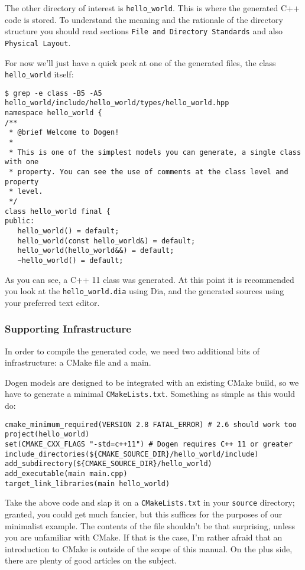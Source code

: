 \documentclass[11pt]{article}
\begin{document}
The other directory of interest is \texttt{hello\_world}. This is where the
generated C++ code is stored. To understand the meaning and the
rationale of the directory structure you should read sections \texttt{File and
Directory Standards} and also \texttt{Physical Layout}.

For now we'll just have a quick peek at one of the generated files,
the class \texttt{hello\_world} itself:

\begin{verbatim}
$ grep -e class -B5 -A5  hello_world/include/hello_world/types/hello_world.hpp
namespace hello_world {
/**
 * @brief Welcome to Dogen!
 *
 * This is one of the simplest models you can generate, a single class with one
 * property. You can see the use of comments at the class level and property
 * level.
 */
class hello_world final {
public:
   hello_world() = default;
   hello_world(const hello_world&) = default;
   hello_world(hello_world&&) = default;
   ~hello_world() = default;
\end{verbatim}

As you can see, a C++ 11 class was generated. At this point it is
recommended you look at the \texttt{hello\_world.dia} using Dia, and the
generated sources using your preferred text editor.

\subsubsection{Supporting Infrastructure}
\label{sec-3-2-3}

In order to compile the generated code, we need two additional bits of
infrastructure: a CMake file and a main.

Dogen models are designed to be integrated with an existing CMake
build, so we have to generate a minimal \texttt{CMakeLists.txt}. Something as
simple as this would do:

\begin{verbatim}
cmake_minimum_required(VERSION 2.8 FATAL_ERROR) # 2.6 should work too
project(hello_world)
set(CMAKE_CXX_FLAGS "-std=c++11") # Dogen requires C++ 11 or greater
include_directories(${CMAKE_SOURCE_DIR}/hello_world/include)
add_subdirectory(${CMAKE_SOURCE_DIR}/hello_world)
add_executable(main main.cpp)
target_link_libraries(main hello_world)
\end{verbatim}

Take the above code and slap it on a \texttt{CMakeLists.txt} in your \texttt{source}
directory; granted, you could get much fancier, but this suffices for
the purposes of our minimalist example. The contents of the file
shouldn't be that surprising, unless you are unfamiliar with CMake. If
that is the case, I'm rather afraid that an introduction to CMake is
outside of the scope of this manual. On the plus side, there are
plenty of good articles on the subject.
\end{document}

